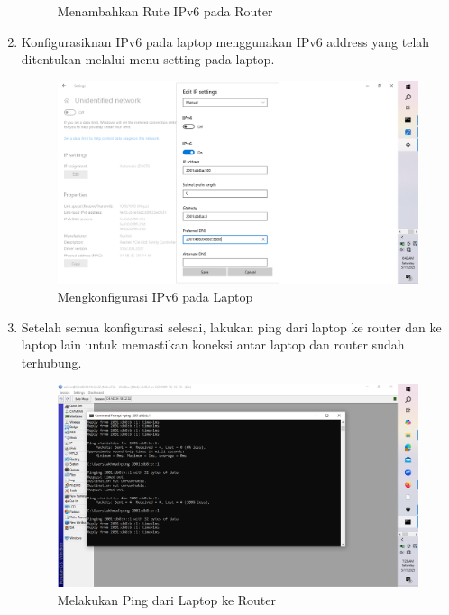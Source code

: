 \begin{enumerate}
\begin{figure}[H]
        \caption{Menambahkan Rute IPv6 pada Router}
        \label{fig:gambar3}
    \end{figure}
    \item Konfigurasiknan IPv6 pada laptop menggunakan IPv6 address yang telah ditentukan melalui menu
    setting pada laptop.
    \begin{figure}[H]
        \centering
        \includegraphics[width=0.5\linewidth]{gambar4.png}
        \caption{Mengkonfigurasi IPv6 pada Laptop}
        \label{fig:gambar4}
    \end{figure}
    \item Setelah semua konfigurasi selesai, lakukan ping dari laptop ke router dan ke laptop lain untuk
    memastikan koneksi antar laptop dan router sudah terhubung.
    \begin{figure}[H]
        \centering
        \includegraphics[width=0.5\linewidth]{ping.png}
        \caption{Melakukan Ping dari Laptop ke Router}
        \label{fig:gambar5}
    \end{figure}
\end{enumerate}


